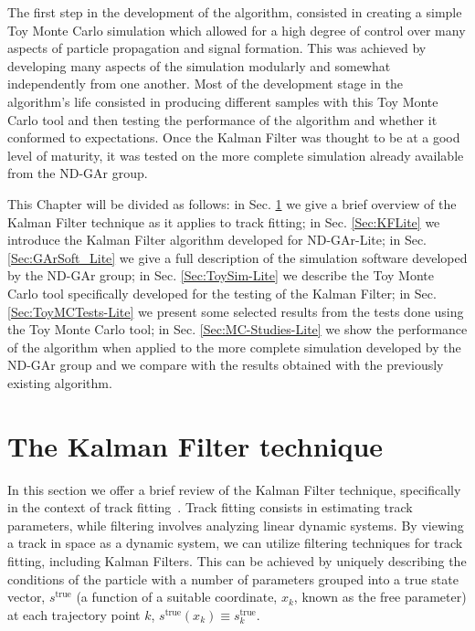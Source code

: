 The first step in the development of the algorithm, consisted in creating a simple Toy Monte Carlo simulation which allowed for a high degree of control over many aspects of particle propagation and signal formation. This was achieved by developing many aspects of the simulation modularly and somewhat independently from one another. Most of the development stage in the algorithm's life consisted in producing different samples with this Toy Monte Carlo tool and then testing the performance of the algorithm and whether it conformed to expectations. Once the Kalman Filter was thought to be at a good level of maturity, it was tested on the more complete simulation already available from the ND-GAr group.

This Chapter will be divided as follows: in Sec. \ref{Sec:KalmanTheory} we give a brief overview of the Kalman Filter technique as it applies to track fitting; in Sec. \ref{Sec:KFLite} we introduce the Kalman Filter algorithm developed for ND-GAr-Lite; in Sec. \ref{Sec:GArSoft_Lite} we give a full description of the simulation software developed by the ND-GAr group; in Sec. \ref{Sec:ToySim-Lite} we describe the Toy Monte Carlo tool specifically developed for the testing of the Kalman Filter; in Sec. \ref{Sec:ToyMCTests-Lite} we present some selected results from the tests done using the Toy Monte Carlo tool; in Sec. \ref{Sec:MC-Studies-Lite} we show the performance of the algorithm when applied to the more complete simulation developed by the ND-GAr group and we compare with the results obtained with the previously existing algorithm.

\section{The Kalman Filter technique}
\label{Sec:KalmanTheory}
In this section we offer a brief review of the Kalman Filter technique, specifically in the context of track fitting~\cite{Bishop1995,Kalman_app}. 
Track fitting consists in estimating track parameters, while filtering involves analyzing linear dynamic systems. By viewing a track in space as a dynamic system, we can utilize filtering techniques for track fitting, including Kalman Filters. This can be achieved by uniquely describing the conditions of the particle with a number of parameters grouped into a true state vector, $s^{\textrm{true}}$ (a function of a suitable coordinate, $x_k$, known as the free parameter) at each trajectory point $k$, $s^{\textrm{true}}(x_k) \equiv s_k^{\textrm{true}}$. 

